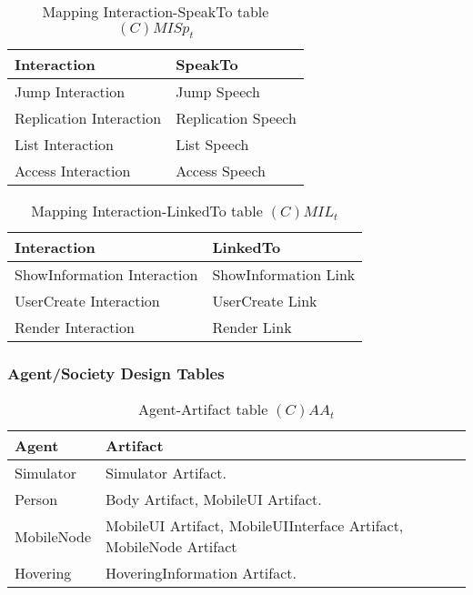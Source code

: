 \begin{table}[H]
	\centering
	\begin{tabular}{|p{4cm}|p{8cm}|}
			\hline
			\textbf{Interaction} & \textbf{SpeakTo} \\
			\hline
			Jump Interaction & Jump Speech \\
			\hline
			Replication Interaction & Replication Speech \\
			\hline
			List Interaction & List Speech \\
			\hline
			Access Interaction & Access Speech \\
			\hline
		\end{tabular}
	\caption{Mapping Interaction-SpeakTo table $(C)MISp_t$}
	\label{tab:cmispt}
\end{table}

\begin{table}[H]
	\centering
	\begin{tabular}{|p{4cm}|p{8cm}|}
			\hline
			\textbf{Interaction} & \textbf{LinkedTo} \\
			\hline
			ShowInformation Interaction & ShowInformation Link \\
			\hline
			UserCreate Interaction & UserCreate Link \\
			\hline
			Render Interaction & Render Link\\
			\hline
		\end{tabular}
	\caption{Mapping Interaction-LinkedTo table $(C)MIL_t$}
	\label{tab:cmilt}
\end{table}

\subsubsection{Agent/Society Design Tables}

\begin{table}[H]
	\centering
	\begin{tabular}{|p{4cm}|p{8cm}|}
			\hline
			\textbf{Agent} & \textbf{Artifact} \\
			\hline
			Simulator & Simulator Artifact. \\
			\hline
			Person & Body Artifact, MobileUI Artifact. \\
			\hline
      MobileNode & MobileUI Artifact, MobileUIInterface Artifact, MobileNode
      Artifact\\
			\hline
			Hovering & HoveringInformation Artifact. \\
			\hline
		\end{tabular}
	\caption{Agent-Artifact table $(C)AA_t$}
	\label{tab:caat}
\end{table}

